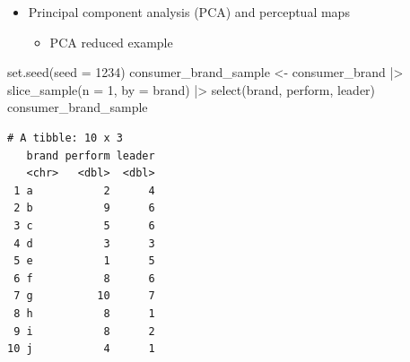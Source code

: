 \documentclass[
  ignorenonframetext,
]{beamer}
\newenvironment{Shaded}{\begin{snugshade}}{\end{snugshade}}
\newcommand{\AttributeTok}[1]{\textcolor[rgb]{0.40,0.45,0.13}{#1}}
\newcommand{\DecValTok}[1]{\textcolor[rgb]{0.68,0.00,0.00}{#1}}
\newcommand{\FunctionTok}[1]{\textcolor[rgb]{0.28,0.35,0.67}{#1}}
\newcommand{\NormalTok}[1]{\textcolor[rgb]{0.00,0.23,0.31}{#1}}
\newcommand{\OtherTok}[1]{\textcolor[rgb]{0.00,0.23,0.31}{#1}}
\newcommand{\SpecialCharTok}[1]{\textcolor[rgb]{0.37,0.37,0.37}{#1}}
\providecommand{\tightlist}{%
  \setlength{\itemsep}{0pt}\setlength{\parskip}{0pt}}\usepackage{longtable,booktabs,array}
\begin{document}
\begin{frame}[fragile]{}
\label{section-11}
\begin{itemize}
\item
  Principal component analysis (PCA) and perceptual maps

  \begin{itemize}
  \tightlist
  \item
    PCA reduced example
  \end{itemize}
\end{itemize}

\tiny

\begin{Shaded}
\begin{Highlighting}[]
\FunctionTok{set.seed}\NormalTok{(}\AttributeTok{seed =} \DecValTok{1234}\NormalTok{)}
\NormalTok{consumer\_brand\_sample }\OtherTok{\textless{}{-}}\NormalTok{ consumer\_brand }\SpecialCharTok{|\textgreater{}}
  \FunctionTok{slice\_sample}\NormalTok{(}\AttributeTok{n =} \DecValTok{1}\NormalTok{, }\AttributeTok{by =}\NormalTok{ brand) }\SpecialCharTok{|\textgreater{}} 
  \FunctionTok{select}\NormalTok{(brand, perform, leader)}
\NormalTok{consumer\_brand\_sample}
\end{Highlighting}
\end{Shaded}

\begin{verbatim}
# A tibble: 10 x 3
   brand perform leader
   <chr>   <dbl>  <dbl>
 1 a           2      4
 2 b           9      6
 3 c           5      6
 4 d           3      3
 5 e           1      5
 6 f           8      6
 7 g          10      7
 8 h           8      1
 9 i           8      2
10 j           4      1
\end{verbatim}
\end{frame}
\end{document}
